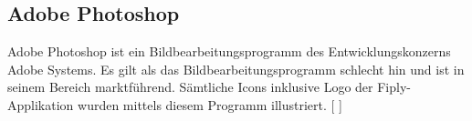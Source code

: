 \documentclass[FIPLY_base.tex]{subfiles}
\begin{document}
	\subsection{Adobe Photoshop}
	Adobe Photoshop ist ein Bildbearbeitungsprogramm des Entwicklungskonzerns Adobe Systems. Es gilt als das Bildbearbeitungsprogramm schlecht hin und ist in seinem Bereich marktführend. Sämtliche Icons inklusive Logo der Fiply-Applikation wurden mittels diesem Programm illustriert. 
	[ \cite{adobephoto}]  
\end{document}
